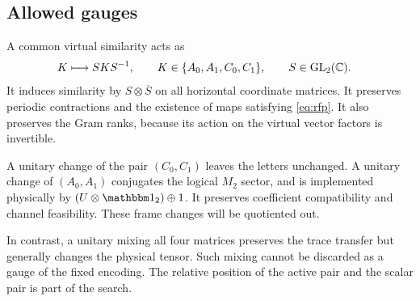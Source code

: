 \subsection{Allowed gauges}

A common virtual similarity acts as
\begin{align}
	K & \longmapsto SKS^{-1},
	\qquad
	K\in\{A_0,A_1,C_0,C_1\},
	\qquad S\in\operatorname{GL}_2(\mathbb{C}).
	\label{eq:virtual-gauge}
\end{align}
It induces similarity by $S\otimes\overline S$ on all horizontal
coordinate matrices. It preserves periodic contractions and the
existence of maps satisfying \cref{eq:rfp}. It also preserves the
Gram ranks, because its action on the virtual vector factors is
invertible.

A unitary change of the pair $(C_0,C_1)$ leaves the letters unchanged.
A unitary change of $(A_0,A_1)$ conjugates the logical $M_2$ sector,
and is implemented physically by $(U\otimes\Id_2)\oplus1$.
It preserves coefficient compatibility and channel feasibility.
These frame changes will be quotiented out.

In contrast, a unitary mixing all four matrices preserves the trace
transfer but generally changes the physical tensor. Such mixing
cannot be discarded as a gauge of the fixed encoding. The relative
position of the active pair and the scalar pair is part of the
search.
